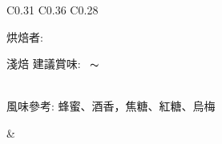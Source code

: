 \documentclass[10pt,a4paper]{article}
\begin{document}
\begin{tabular}{C{0.31\textwidth} C{0.36\textwidth} C{0.28\textwidth}}
{{烘焙者: \textbf{\scriptsize{}}}\vspace*{-0.3em}\\
 \addtocounter{datenumber}{
6 }%
\setdatebynumber{\thedatenumber} 
{\normalsize 
淺焙%
\enskip \scriptsize 建議賞味:} \scriptsize{\datemonthname ~\thedateday}$\thicksim$\addtocounter{datenumber}{55}\setdatebynumber{\thedatenumber} \datedate
\\\scriptsize 風味參考: 蜂蜜、酒香，焦糖、紅糖、烏梅
} & \shortstack[c]{
%
%
\hspace*{1.3cm} { \vspace*{-0.68cm}\Large 
}}
\end{tabular}
\end{document}
